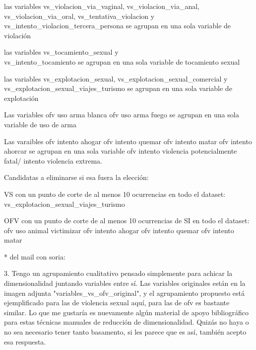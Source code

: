 \documentclass[10 pt]{article}
\begin{document}
las variables vs\_violacion\_via\_vaginal,  vs\_violacion\_via\_anal,  vs\_violacion\_via\_oral, vs\_tentativa\_violacion y vs\_intento\_violacion\_tercera\_persona se agrupan en una sola variable de violación

las variables vs\_tocamiento\_sexual y \\ vs\_intento\_tocamiento se agrupan en una sola variable de tocamiento sexual



las variables vs\_explotacion\_sexual,  vs\_explotacion\_sexual\_comercial y vs\_explotacion\_sexual\_viajes\_turismo se agrupan en una sola variable de explotación


Las variables ofv uso arma blanca ofv uso arma fuego se agrupan en una sola variable de uso de arma

Las varaibles ofv intento ahogar ofv intento quemar 
ofv intento matar ofv intento ahorcar se agrupan en una sola variable ofv intento violencia potencialmente fatal/ intento violencia extrema.


Candidatas a eliminarse si esa fuera la elección: 

VS con un punto de corte de al menos 10 ocurrencias en todo el dataset: vs\_explotacion\_sexual\_viajes\_turismo



OFV con un punto de corte de al menos 10 ocurrencias de SI en todo el dataset: ofv uso animal victimizar
ofv intento ahogar
ofv intento quemar 
ofv intento matar


* del mail con soria:

3. Tengo un agrupamiento cualitativo pensado simplemente para achicar la dimensionalidad juntando variables entre sí. Las variables originales están en la imagen adjunta "variables\_vs\_ofv\_original", y el agrupamiento propuesto está ejemplificado para las de violencia sexual aquí, para las de ofv es bastante similar. Lo que me gustaría es nuevamente algún material de apoyo bibliográfico para estas técnicas manuales de reducción de dimensionalidad. Quizás no haya o no sea necesario tener tanto basamento, si les parece que es así, también acepto esa respuesta.
\end{document}
